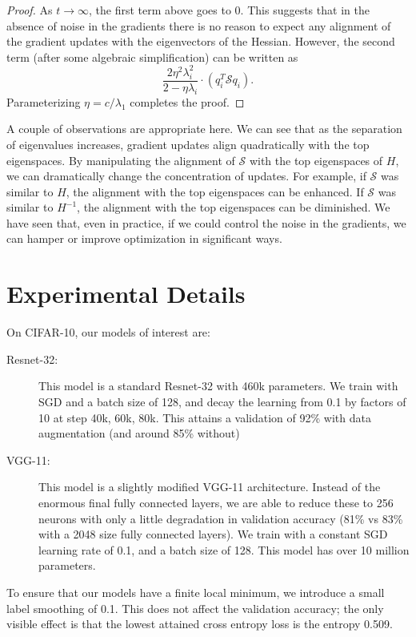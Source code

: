 \documentclass{article}
\newcommand{\Noise}{\mathcal{S}}
\begin{document}
\begin{proof}
As $t \to \infty$, the first term above goes to 0. This suggests that in the absence of noise in the gradients there is no reason to expect any alignment of the gradient updates with the eigenvectors of the Hessian. However, the second term (after some algebraic simplification) can be written as 
$$\frac{2 \eta^2 \lambda_i^2}{2 - \eta \lambda_i} \cdot (q_i^T \Noise q_i).
$$
Parameterizing $\eta = c/ \lambda_1$ completes the proof.


\end{proof}
A couple of observations are appropriate here. We can see that as the separation of eigenvalues increases, gradient updates align quadratically with the top eigenspaces. By manipulating the alignment of $\Noise$ with the top eigenspaces of $H$, we can dramatically change the concentration of updates. For example, if $\Noise$ was similar to $H$, the alignment with the top eigenspaces can be enhanced. If $\Noise$ was similar to $H^{-1}$, the alignment with the top eigenspaces can be diminished. We have seen that, even in practice, if we could control the noise in the gradients, we can hamper or improve optimization in significant ways.

\section{Experimental Details}
\label{app:details}

On CIFAR-10, our models of interest are:
\begin{description}
\item[Resnet-32:] This model is a standard Resnet-32 with 460k parameters. We train with SGD and a batch size of 128, and decay the learning from 0.1 by factors of 10 at step 40k, 60k, 80k. This attains a validation of 92\% with data augmentation (and around 85\% without)
\item[VGG-11:] This model is a slightly modified VGG-11 architecture. Instead of the enormous final fully connected layers, we are able to reduce these to 256 neurons with only a little degradation in validation accuracy (81\% vs 83\% with a 2048 size fully connected layers). We train with a constant SGD learning rate of 0.1, and a batch size of 128. This model has over 10 million parameters.
\end{description}
To ensure that our models have a finite local minimum, we introduce a small label smoothing of 0.1. This does not affect the validation accuracy; the only visible effect is that the lowest attained cross entropy loss is the entropy 0.509.
\end{document}
